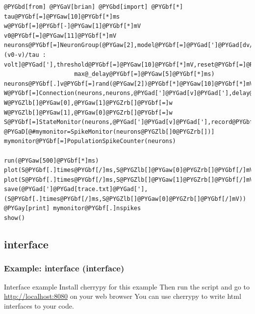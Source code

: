 \documentclass[letterpaper,10pt,english]{manual}
\begin{document}
\begin{Verbatim}[commandchars=@\[\]]
@PYGbd[from] @PYGaV[brian] @PYGbd[import] @PYGbf[*]
tau@PYGbf[=]@PYGaw[10]@PYGbf[*]ms
w@PYGbf[=]@PYGbf[-]@PYGaw[1]@PYGbf[*]mV
v0@PYGbf[=]@PYGaw[11]@PYGbf[*]mV
neurons@PYGbf[=]NeuronGroup(@PYGaw[2],model@PYGbf[=]@PYGad[']@PYGad[dv/dt=(v0-v)/tau : volt]@PYGad['],threshold@PYGbf[=]@PYGaw[10]@PYGbf[*]mV,reset@PYGbf[=]@PYGaw[0]@PYGbf[*]mV,\
                    max@_delay@PYGbf[=]@PYGaw[5]@PYGbf[*]ms)
neurons@PYGbf[.]v@PYGbf[=]rand(@PYGaw[2])@PYGbf[*]@PYGaw[10]@PYGbf[*]mV
W@PYGbf[=]Connection(neurons,neurons,@PYGad[']@PYGad[v]@PYGad['],delay@PYGbf[=]@PYGaw[2]@PYGbf[*]ms)
W@PYGZlb[]@PYGaw[0],@PYGaw[1]@PYGZrb[]@PYGbf[=]w
W@PYGZlb[]@PYGaw[1],@PYGaw[0]@PYGZrb[]@PYGbf[=]w
S@PYGbf[=]StateMonitor(neurons,@PYGad[']@PYGad[v]@PYGad['],record@PYGbf[=]@PYGaA[True])
@PYGaD[@#mymonitor=SpikeMonitor(neurons@PYGZlb[]0@PYGZrb[])]
mymonitor@PYGbf[=]PopulationSpikeCounter(neurons)

run(@PYGaw[500]@PYGbf[*]ms)
plot(S@PYGbf[.]times@PYGbf[/]ms,S@PYGZlb[]@PYGaw[0]@PYGZrb[]@PYGbf[/]mV)
plot(S@PYGbf[.]times@PYGbf[/]ms,S@PYGZlb[]@PYGaw[1]@PYGZrb[]@PYGbf[/]mV)
save(@PYGad[']@PYGad[trace.txt]@PYGad['],(S@PYGbf[.]times@PYGbf[/]ms,S@PYGZlb[]@PYGaw[0]@PYGZrb[]@PYGbf[/]mV))
@PYGay[print] mymonitor@PYGbf[.]nspikes
show()
\end{Verbatim}


\subsection{interface}

\resetcurrentobjects
\hypertarget{--doc-examples-interface_interface}{}

\hypertarget{example-interface-interface}{}\subsubsection{Example: interface (interface)}

Interface example
Install cherrypy for this example
Then run the script and go to \href{http://localhost:8080}{http://localhost:8080} on your web browser
You can use cherrypy to write html interfaces to your code.
\end{document}
